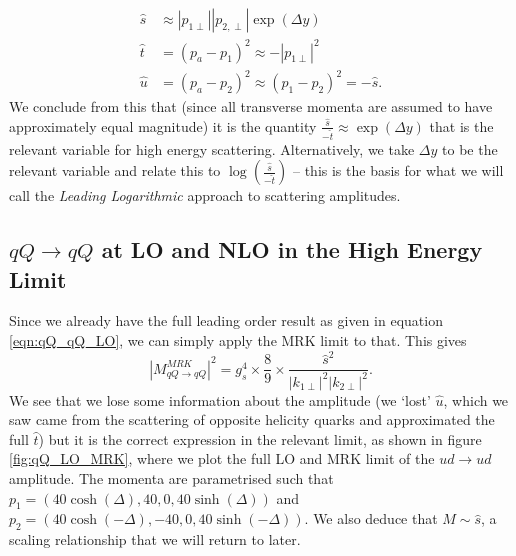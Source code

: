 \begin{subequations}
\begin{align}
\hat{s} &\approx |p_{1 \perp}| |p_{2, \perp}| \exp(\Delta y) \\
\hat{t}  &= (p_a - p_1)^2 \approx  -|p_{1 \perp}|^2 \\
\hat{u} &= (p_a - p_2)^2 \approx (p_1 - p_2)^2 = -\hat{s}.
\end{align}
\end{subequations}
We conclude from this that (since all transverse momenta are assumed to have approximately equal magnitude) it is the quantity $\frac{\hat{s}}{-\hat{t}} \approx \exp(\Delta y)$ that is the relevant variable for high energy scattering. Alternatively, we take $\Delta y$ to be the relevant variable and relate this to $\log(\frac{\hat{s}}{-\hat{t}})$ -- this is the basis for what we will call the \emph{Leading Logarithmic} approach to scattering amplitudes. 

\subsection{$qQ \to qQ$ at LO and NLO in the High Energy Limit}

Since we already have the full leading order result as given in equation \ref{eqn:qQ_qQ_LO}, we can simply apply the MRK limit to that. This gives
\begin{equation}
|M_{qQ\to qQ}^{MRK}|^2 = g_s^4 \times \frac{8}{9} \times \frac{\hat{s}^2}{|k_{1 \perp}|^2 |k_{2 \perp}|^2}.
\end{equation}
We see that we lose some information about the amplitude (we `lost' $\hat{u}$, which we saw came from the scattering of opposite helicity quarks and approximated the full $\hat{t}$) but it is the correct expression in the relevant limit, as shown in figure \ref{fig:qQ_LO_MRK}, where we plot the full LO and MRK limit of the $ud \to ud$ amplitude. The momenta are parametrised such that $p_1 =  \left(40 \cosh(\Delta), 40, 0, 40 \sinh(\Delta) \right)$ and $p_2 =  \left(40 \cosh(-\Delta), -40, 0, 40 \sinh(-\Delta) \right)$. We also deduce that $M \sim \hat{s}$, a scaling relationship that we will return to later.

